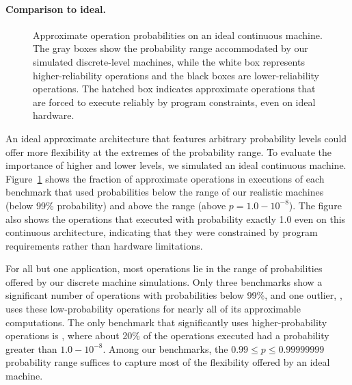 {\paragraph{Comparison to ideal.}

\begin{figure}
    \hspace{-3ex}
    
    \caption{Approximate operation probabilities on an ideal continuous
    machine. The gray boxes show the probability range accommodated by
    our simulated discrete-level machines, while the white box represents
    higher-reliability operations and the black boxes are
    lower-reliability operations.
    The hatched box indicates approximate operations that are forced to
    execute reliably by program constraints, even on ideal hardware.}
    \label{decaf:fig:idealhist}
\end{figure}

An ideal approximate architecture that features arbitrary probability levels
could offer more flexibility at the extremes of the probability range.
To evaluate the importance of higher and lower levels, we
simulated an ideal continuous machine.
Figure~\ref{decaf:fig:idealhist} shows the fraction of approximate operations in
executions of each benchmark that used probabilities below the range of our
realistic machines (below 99\% probability) and above the range (above $p =
1.0 - 10^{-8}$).
The figure also shows the operations that executed with probability exactly
1.0 even on this continuous architecture, indicating that they were
constrained by program requirements rather than hardware limitations.

For all but one application, most operations lie in the range of probabilities
offered by our discrete machine simulations.
Only three benchmarks show a significant number of operations with
probabilities below 99\%, and one outlier, , uses these
low-probability operations for nearly all of its approximable computations.
The only benchmark that significantly uses higher-probability operations
is , where about 20\% of the operations executed had a probability
greater than $1.0 - 10^{-8}$.
Among our benchmarks, the $0.99 \le p \le 0.99999999$ probability range
suffices to capture most of the flexibility offered by an ideal machine.


}
